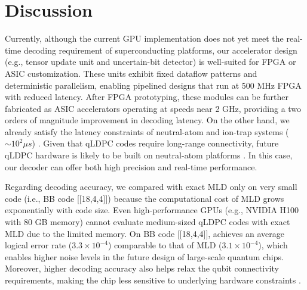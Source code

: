 \section{Discussion}

Currently, although the current GPU implementation does not yet meet the real-time decoding requirement of superconducting platforms, our accelerator design (e.g., tensor update unit and uncertain-bit detector) is well-suited for FPGA or ASIC customization. These units exhibit fixed dataflow patterns and deterministic parallelism, enabling pipelined designs that run at 500 MHz FPGA with reduced latency. After FPGA prototyping, these modules can be further fabricated as ASIC accelerators operating at speeds near 2 GHz, providing a two orders of magnitude improvement in decoding latency. On the other hand, we already satisfy the latency constraints of neutral-atom and ion-trap systems ($\sim 10^2 \mu s$) \cite{wolanski2024ambiguity}. Given that qLDPC codes require long-range connectivity, future qLDPC hardware is likely to be built on neutral-atom platforms \cite{pecorari2025high}. In this case, our decoder can offer both high precision and real-time performance. 

Regarding decoding accuracy, we compared \papername with exact MLD only on very small code (i.e., BB code [[18,4,4]]) because the computational cost of MLD grows exponentially with code size. Even high-performance GPUs (e.g., NVIDIA H100 with 80 GB memory) cannot evaluate medium-sized qLDPC codes with exact MLD due to the limited memory. On BB code [[18,4,4]], \papername achieves an average logical error rate ($3.3\times10^{-4}$) comparable to that of MLD ($3.1\times10^{-4}$), which enables higher noise levels in the future design of large-scale quantum chips. Moreover, higher decoding accuracy also helps relax the qubit connectivity requirements, making the chip less sensitive to underlying hardware constraints \cite{cao2025exact,chubb2021statistical}.

